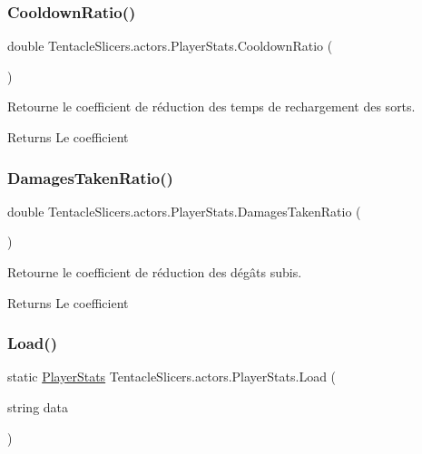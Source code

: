 \subsubsection{\texorpdfstring{Cooldown\+Ratio()}{CooldownRatio()}}
{\footnotesize\ttfamily double Tentacle\+Slicers.\+actors.\+Player\+Stats.\+Cooldown\+Ratio (\begin{DoxyParamCaption}{ }\end{DoxyParamCaption})}



Retourne le coefficient de réduction des temps de rechargement des sorts. 

\begin{DoxyReturn}{Returns}
Le coefficient 
\end{DoxyReturn}
\mbox{\label{class_tentacle_slicers_1_1actors_1_1_player_stats_a210da673cb3fb0cddfe07e8a65dbfebd}} 
\subsubsection{\texorpdfstring{Damages\+Taken\+Ratio()}{DamagesTakenRatio()}}
{\footnotesize\ttfamily double Tentacle\+Slicers.\+actors.\+Player\+Stats.\+Damages\+Taken\+Ratio (\begin{DoxyParamCaption}{ }\end{DoxyParamCaption})}



Retourne le coefficient de réduction des dégâts subis. 

\begin{DoxyReturn}{Returns}
Le coefficient 
\end{DoxyReturn}
\mbox{\label{class_tentacle_slicers_1_1actors_1_1_player_stats_a9e9edcd409cbe2f955f4f7313c4a36dd}} 
\subsubsection{\texorpdfstring{Load()}{Load()}}
{\footnotesize\ttfamily static \hyperlink{class_tentacle_slicers_1_1actors_1_1_player_stats}{Player\+Stats} Tentacle\+Slicers.\+actors.\+Player\+Stats.\+Load (\begin{DoxyParamCaption}\item[{string}]{data }\end{DoxyParamCaption})\hspace{0.3cm}{\ttfamily [static]}}



